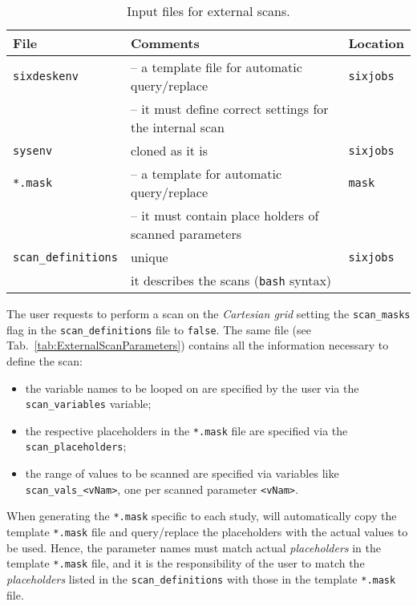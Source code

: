 \begin{table}[t]
\begin{center}
    \caption{Input files for external scans.}
    \label{tab:ExternalScanInputFile}
    \begin{tabular}{|l|l|l|}
    \hline
    \rowcolor{blue!30}
    \textbf{File} & \textbf{Comments} & \textbf{Location} \\
    \hline
    \texttt{sixdeskenv} & -- a template file for automatic query/replace
    & \texttt{sixjobs} \\
    & -- it must define correct settings for the internal scan & \\
    \texttt{sysenv} & cloned as it is & \texttt{sixjobs} \\
    \texttt{*.mask} & -- a template for automatic query/replace & \texttt{mask} \\
    & -- it must contain place holders of scanned parameters & \\
    \texttt{scan\_definitions} & unique & \texttt{sixjobs} \\
    & it describes the scans (\texttt{bash} syntax) & \\
    \hline
    \end{tabular}
\end{center}
\end{table}

The user requests \SIXDESK{} to perform a scan on the \emph{Cartesian grid}
setting the \texttt{scan\_masks} flag in the \texttt{scan\_definitions} file
to \texttt{false}. The same file (see Tab.~\ref{tab:ExternalScanParameters})
contains all the information necessary to define the scan:
\begin{itemize}
\item the variable names to be looped on are specified by the user via
  the \texttt{scan\_variables} variable;
\item the respective placeholders in the \texttt{*.mask} file are
  specified via the \texttt{scan\_placeholders};
\item the range of values to be scanned are specified via variables
  like \texttt{scan\_vals\_<vNam>}, one per scanned parameter
  \texttt{<vNam>}.
\end{itemize}

When generating the \texttt{*.mask} specific to each study,
\SIXDESK{} will automatically copy the template \texttt{*.mask}
file and query/replace the placeholders with the actual values to be used.
Hence, the parameter names must match actual \emph{placeholders} in the
template \texttt{*.mask} file, and it is the responsibility of the
user to match the \emph{placeholders} listed in the \texttt{scan\_definitions}
with those in the template \texttt{*.mask} file.

